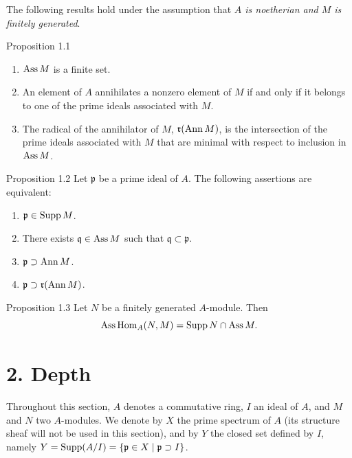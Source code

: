 The following results hold under the assumption that \emph{$A$ is noetherian
and $M$ is finitely generated}.

\begin{sgastatement}{Proposition 1.1}
\begin{enumerate}[label=\textup{(\roman*)},leftmargin=2.5em]
  \item $\operatorname{Ass} M$ is a finite set.
  \item An element of $A$ annihilates a nonzero element of $M$ if and only
  if it belongs to one of the prime ideals associated with $M$.
  \item The radical of the annihilator of $M$,
  $\mathfrak r(\operatorname{Ann} M)$, is the intersection of the prime ideals associated
  with $M$ that are minimal with respect to inclusion in $\operatorname{Ass} M$.
\end{enumerate}
\end{sgastatement}

\begin{sgastatement}{Proposition 1.2}
Let $\mathfrak p$ be a prime ideal of $A$. The following assertions are
equivalent:
\begin{enumerate}[label=\textup{(\roman*)},leftmargin=2.8em]
  \item $\mathfrak p\in\operatorname{Supp} M$.
  \item There exists $\mathfrak q\in\operatorname{Ass} M$ such that
  $\mathfrak q\subset\mathfrak p$.
  \item $\mathfrak p\supset\operatorname{Ann} M$.
  \item[\textup{(iii bis)}] $\mathfrak p\supset\mathfrak r(\operatorname{Ann} M)$.
\end{enumerate}
\end{sgastatement}

\begin{sgastatement}{Proposition 1.3}
Let $N$ be a finitely generated $A$-module. Then
\[
  \operatorname{Ass}\operatorname{Hom}_A(N,M)=\operatorname{Supp} N\cap\operatorname{Ass} M.
\]
\end{sgastatement}



\section*{2. Depth}

Throughout this section, $A$ denotes a commutative ring, $I$ an ideal of
$A$, and $M$ and $N$ two $A$-modules. We denote by $X$ the prime spectrum of
$A$ (its structure sheaf will not be used in this section), and by $Y$ the
closed set defined by $I$, namely
$Y=\operatorname{Supp}(A/I)=\{\mathfrak p\in X\mid \mathfrak p\supset I\}$.

